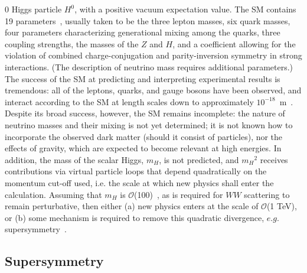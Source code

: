 0 Higgs particle $H^0$, with a positive vacuum expectation value. The SM contains
19 parameters~\cite{perkins2000introduction}, usually taken to be the three lepton masses, six quark masses,
four parameters characterizing generational mixing among the quarks, three coupling
strengths, the masses of the $Z$ and $H$, and a coefficient allowing for the violation of
combined charge-conjugation and parity-inversion symmetry in strong interactions.
(The description of neutrino mass requires additional parameters.)
The success of the SM at predicting and interpreting experimental results is
tremendous: all of the leptons, quarks, and gauge bosons have been observed, and
interact according to the SM at length scales down to approximately $10^{-18}$~m~\cite{perkins2000introduction}.
Despite its broad success, however, the SM remains incomplete: the nature of neutrino
masses and their mixing is not yet determined; it is not known how to incorporate
the observed dark matter (should it consist of particles), nor the effects of gravity,
which are expected to become relevant at high energies. In addition, the mass of the
scalar Higgs, $m_H$, is not predicted, and ${m_{H}}^2$ receives contributions
via virtual particle loops that depend quadratically on the momentum cut-off used,
i.e. the scale at which new physics shall enter the calculation. Assuming that $m_H$ is
$\mathcal{O}$(100)~\GeV, as is required for $WW$ scattering to remain perturbative, then either
(a) new physics enters at the scale of $\mathcal{O}$(1 TeV), or (b) some mechanism is required
to remove this quadratic divergence, $e.g.$ supersymmetry~\cite{Martin:1997ns}.
\subsection{Supersymmetry\label{sec:SUSY}}

